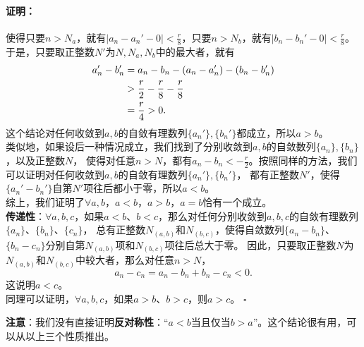 \documentclass[12pt,UTF8]{ctexbook}
\renewenvironment{proof}{\paragraph{\textbf{证明：}}}{\hfill$\square$}
\begin{document}
\begin{appendix}
\begin{proof}
    使得只要$n>N_a$，就有$|a_n - a_n' - 0| < \frac{r}{8}$，只要$n>N_b$，就有$|b_n - b_n' - 0| < \frac{r}{8}$。
    于是，只要取正整数$N'$为$N,N_a,N_b$中的最大者，就有
    \begin{align}
        a_n' - b_n' &= a_n - b_n - (a_n - a_n') - (b_n - b_n') \notag \\
        &> \frac{r}{2} - \frac{r}{8} - \frac{r}{8} \notag \\
        &= \frac{r}{4} > 0. \notag
    \end{align}
    这个结论对任何收敛到$a,b$的自敛有理数列$\{a_n'\}, \{b_n'\}$都成立，所以$a>b$。\\
    类似地，如果设后一种情况成立，我们找到了分别收敛到$a,b$的自敛数列$\{a_n\}, \{b_n\}$，以及正整数$N$，
    使得对任意$n>N$，都有$a_n - b_n < -\frac{r}{2}$。按照同样的方法，我们可以证明对任何收敛到$a,b$的自敛有理数列$\{a_n'\}, \{b_n'\}$，
    都有正整数$N'$，使得$\{a_n' - b_n'\}$自第$N'$项往后都小于零，所以$a<b$。\\
    综上，我们证明了$\forall a, b$，$a < b$，$a > b$，$a = b$恰有一个成立。\\
    \textbf{传递性}：$\forall a, b, c$，如果$a < b$、$b < c$，那么对任何分别收敛到$a,b,c$的自敛有理数列$\{a_n\}$、$\{b_n\}$、$\{c_n\}$，
    总有正整数$N_{(a,b)}$和$N_{(b,c)}$，使得自敛数列$\{a_n - b_n\}$、$\{b_n - c_n\}$分别自第$N_{(a,b)}$项和$N_{(b,c)}$项往后总大于零。
    因此，只要取正整数$N$为$N_{(a,b)}$和$N_{(b,c)}$中较大者，那么对任意$n>N$，
    $$ a_n - c_n = a_n - b_n + b_n - c_n < 0.$$
    这说明$a<c$。\\
    同理可以证明，$\forall a, b, c$，如果$a > b$、$b > c$，则$a > c$。
\end{proof}

\textbf{注意}：我们没有直接证明\textbf{反对称性}：“$a<b$当且仅当$b>a$”。这个结论很有用，可以从以上三个性质推出。


\end{appendix}
\end{document}
